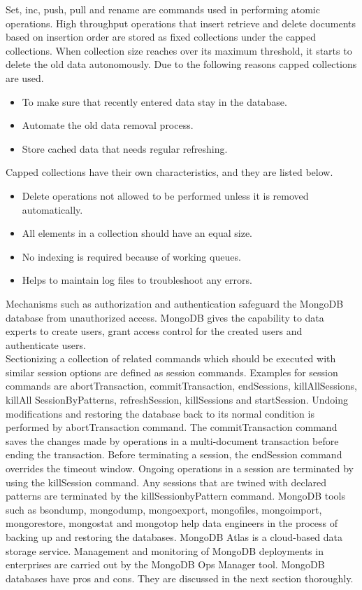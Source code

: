 \documentclass[a4Paper,12pt]{report}
\begin{document}
Set, inc, push, pull and rename are commands used in performing atomic operations. High throughput operations that insert retrieve and delete documents based on insertion order are stored as fixed collections under the capped collections. When collection size reaches over its maximum threshold, it starts to delete the old data autonomously. Due to the following reasons capped collections are used.
\begin{itemize}
\item To make sure that recently entered data stay in the database.
\item Automate the old data removal process.
\item Store cached data that needs regular refreshing.
\end{itemize}
Capped collections have their own characteristics, and they are listed below.
\begin{itemize}
\item Delete operations not allowed to be performed unless it is removed automatically.
\item All elements in a collection should have an equal size.
\item No indexing is required because of working queues.
\item Helps to maintain log files to troubleshoot any errors.
\end{itemize}
Mechanisms such as authorization and authentication safeguard the MongoDB database from unauthorized access. MongoDB gives the capability to data experts to create users, grant access control for the created users and authenticate users.\\[12pt]
Sectionizing a collection of related commands which should be executed with similar session options are defined as session commands. Examples for session commands are abortTransaction, commitTransaction, endSessions, killAllSessions, killAll SessionByPatterns, refreshSession, killSessions and startSession. Undoing modifications and restoring the database back to its normal condition is performed by abortTransaction command. The commitTransaction command saves the changes made by operations in a multi-document transaction before ending the transaction. Before terminating a session, the endSession command overrides the timeout window. Ongoing operations in a session are terminated by using the killSession command. Any sessions that are twined with declared patterns are terminated by the killSessionbyPattern command. MongoDB tools such as bsondump, mongodump, mongoexport, mongofiles, mongoimport, mongorestore, mongostat and mongotop help data engineers in the process of backing up and restoring the databases. MongoDB Atlas is a cloud-based data storage service. Management and monitoring of MongoDB deployments in enterprises are carried out by the MongoDB Ops Manager tool. MongoDB databases have pros and cons. They are discussed in the next section thoroughly.
\end{document}
